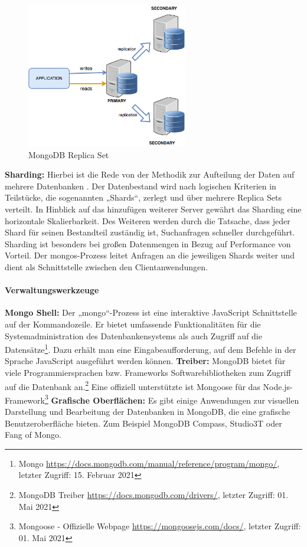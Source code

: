 \begin{figure}[tbt]
\centering
\includegraphics[width=7cm]{images/replicaset1.png}
\caption{MongoDB Replica Set}
\end{figure}


\noindent
{}
\textbf{Sharding:}
Hierbei ist die Rede von der Methodik zur Aufteilung der Daten auf mehrere Datenbanken \cite{DB4.1}.
Der Datenbestand wird nach logischen Kriterien in  Teilstücke, die sogenannten „Shards“, zerlegt und über mehrere Replica Sets verteilt.
In Hinblick auf das hinzufügen weiterer Server gewährt das Sharding eine horizontale Skalierbarkeit.
Des Weiteren werden durch die Tatsache, dass jeder Shard für seinen Bestandteil zuständig ist,  Suchanfragen schneller durchgeführt. 
Sharding ist besonders bei großen Datenmengen in Bezug auf Performance von Vorteil.
Der mongos-Prozess leitet Anfragen an die jeweiligen Shards weiter und dient als Schnittstelle zwischen den Clientanwendungen.

\paragraph{Verwaltungswerkzeuge}
\noindent
{}
\textbf{Mongo Shell:}
Der „mongo“-Prozess ist eine interaktive JavaScript Schnittstelle auf der Kommandozeile. Er bietet umfassende Funktionalitäten für die Systemadministration des Datenbankensystems als auch Zugriff auf die Datensätze\footnote{Mongo \url{https://docs.mongodb.com/manual/reference/program/mongo/}, letzter Zugriff: 15. Februar 2021}. Dazu erhält man eine Eingabeaufforderung, auf dem Befehle in der Sprache JavaScript ausgeführt werden können.
\noindent
{}
\textbf{Treiber:}
MongoDB bietet für viele Programmiersprachen bzw. Frameworks Softwarebibliotheken zum Zugriff auf die Datenbank an.\footnote{MongoDB Treiber \url{https://docs.mongodb.com/drivers/}, letzter Zugriff: 01. Mai 2021}  Eine offiziell unterstützte ist Mongoose für das Node.js-Framework\footnote{Mongoose - Offizielle Webpage \url{https://mongoosejs.com/docs/}, letzter Zugriff: 01. Mai 2021}
\newpage
\noindent
{}
\textbf{Grafische Oberflächen:}
Es gibt einige Anwendungen zur visuellen Darstellung und Bearbeitung der Datenbanken in MongoDB, die eine grafische Benutzeroberfläche bieten. Zum Beispiel MongoDB Compass, Studio3T oder Fang of Mongo. 


